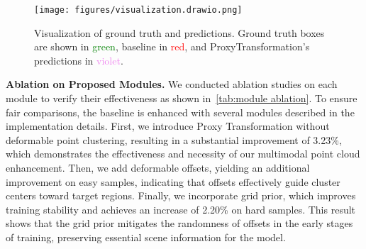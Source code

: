 \begin{figure*}
    \centering
    \texttt{[image: figures/visualization.drawio.png]}
    \caption{Visualization of ground truth and predictions. Ground truth boxes are shown in \textcolor{green}{green}, baseline in \textcolor{red}{red}, and ProxyTransformation's predictions in \textcolor{violet}{violet}.}
    \label{fig:predict_anchors}
    \vspace{-0.2cm}
\end{figure*}


\noindent \textbf{Ablation on Proposed Modules.}
We conducted ablation studies on each module to verify their effectiveness as shown in~\cref{tab:module ablation}. To ensure fair comparisons, the baseline is enhanced with several modules described in the implementation details. First, we introduce Proxy Transformation without deformable point clustering, resulting in a substantial improvement of 3.23\%, which demonstrates the effectiveness and necessity of our multimodal point cloud enhancement. Then, we add deformable offsets, yielding an additional improvement on easy samples, indicating that offsets effectively guide cluster centers toward target regions. Finally, we incorporate grid prior, which improves training stability and achieves an increase of 2.20\% on hard samples. This result shows that the grid prior mitigates the randomness of offsets in the early stages of training, preserving essential scene information for the model.

